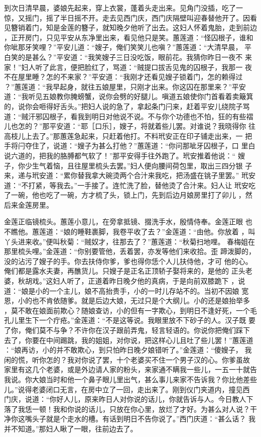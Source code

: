 到次日清早晨，婆娘先起来，穿上衣裳，蓬着头走出来。见角门没插，吃了一
惊，又摇门，摇了半日摇不开。走去见西门庆，西门庆隔壁叫迎春替他开了。因看
见簪销着门，知是金莲的簪子，就知晚夕他听了出去。这妇人怀着鬼胎，走到前边
，正开房门，只见平安从东净里出来，看见他只是笑。蕙莲道：“怪囚根子，谁和
你呲那牙笑哩？”平安儿道：“嫂子，俺们笑笑儿也嗔？”蕙莲道：“大清早晨，
平白笑的是甚么？”平安道：“我笑嫂子三日没吃饭，眼前花。我猜你昨日一夜不
来家！”妇人听了此言，便把脸红了，骂道：“贼提口拔舌见鬼的囚根子，我那一
夜不在屋里睡？怎的不来家？”平安道：“我刚才还看见嫂子锁着门，怎的赖得过
？”蕙莲道：“我早起身，就往五娘屋里，只刚才出来。你这囚在那里来？”平安
道：“我听见五娘教你腌螃蟹，说你会劈的好腿儿。嗔道五娘使你门首看着卖簸箕
的，说你会咂得好舌头。”把妇人说的急了，拿起条门闩来，赶着平安儿绕院子骂
道：“贼汗邪囚根子，看我到明日对他说不说。不与你个功德也不怕，狂的有些褶
儿也怎的？”那平安道：“耶［口乐］，嫂子，将就着些儿罢。对谁说？我晓得你
往高枝儿上去了。”那蕙莲急起来，只赶着他打。不料玳安正在印子铺走出来，一
把手将闩夺住了，说道：“嫂子为甚么打他？”蕙莲道：“你问那呲牙囚根子，口
里白说六道的，把我的胳膊都气软了！”那平安得手往外跑了。玳安推着他说：“
嫂子，你少生气着恼，且往屋里梳头去罢。”妇人便向腰间荷包里，取出三四分银
子来，递与玳安道：“累你替我拿大碗烫两个合汁来我吃，把汤盛在铫子里罢。”
玳安道：“不打紧，等我去。”一手接了。连忙洗了脸，替他烫了合汁来。妇人让
玳安吃了一碗，他也吃了一碗，方才梳了头，锁上门，先到后边月娘房里打了卯儿
，然后来金莲房里。

金莲正临镜梳头。蕙莲小意儿，在旁拿抵镜、掇洗手水，殷情侍奉。金莲正眼
也不瞧他。蕙莲道：“娘的睡鞋裹脚，我卷平收了去？”金莲道：“由他。你放着
，叫丫头进来收。”便叫秋菊：“贼奴才，往那去了？”蕙莲道：“秋菊扫地哩。
春梅姐在那里梳头哩。”金莲道：“你别要管他，丢着罢，亦发等他们来收拾。歪
蹄泼脚的，没的沾污了嫂子的手。你去扶侍你爹，爹也得你恁个人儿扶侍他，才可
他的心。俺们都是露水夫妻，再醮货儿。只嫂子是正名正顶轿子娶将来的，是他的
正头老婆，秋胡戏。”这妇人听了，正道着昨日晚夕他的真病，于是向前双膝跪下
，说道：“娘是小的一个主儿，娘不高抬贵手，小的一时儿存站不的。当初不因娘
宽恩，小的也不肯依随爹。就是后边大娘，无过只是个大纲儿。小的还是娘抬举多
，莫不敢在娘面前欺心？随娘查访，小的但有一字欺心，到明日不逢好死，一个毛
孔儿里生下一个疔疮。”金莲道：“不是这等说。我眼里放不下砂子的人。汉子既
要了你，俺们莫不与争？不许你在汉子跟前弄鬼，轻言轻语的。你说你把俺们踩下
去了，你要在中间踢跳，我的姐姐，对你说，把这样心儿且吐了些儿罢！”蕙莲道
：“娘再访，小的并不敢欺心，到只怕昨日晚夕娘错听了。”金莲道：“傻嫂子，
我闲的慌，听你怎的？我对你说了罢，十个老婆买不住一个男子汉的心。你爹虽故
家里有这几个老婆，或是外边请人家的粉头，来家通不瞒我一些儿，一五一十就告
我说。你大娘当时和他一个鼻子眼儿里出气，甚么事儿来家不告诉我？你比他差些
儿。”说得老婆闭口无言，在房中立了一回，走出来了。刚到仪门夹道内，撞见西
门庆，说道：“你好人儿，原来昨日人对你说的话儿，你就告诉与人。今日教人下
落了我恁一顿！我和你说的话儿，只放在你心里，放烂了才好。为甚么对人说？干
净你这嘴头子就是个走水的槽。有话到明日不告你说了。”西门庆道：“甚么话？
我并不知道。”那妇人瞅了一眼，往前边去了。

